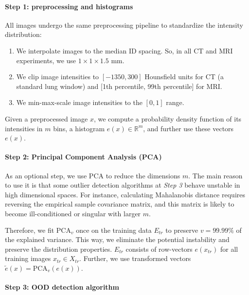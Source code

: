 \paragraph{Step 1: preprocessing and histograms} All images undergo the same preprocessing pipeline to standardize the intensity distribution:

\begin{enumerate}	
	\item We interpolate images to the median ID spacing. So, in all CT and MRI experiments, we use $1 \times 1 \times 1.5$ mm.
	\item We clip image intensities to $[-1350, 300]$ Hounsfield units for CT (a standard lung window) and [1{th} percentile, 99{th} percentile] for MRI.
	\item We min-max-scale image intensities to the $[0, 1]$ range.
\end{enumerate}

Given a preprocessed image $x$, we compute a probability density function of its intensities in $m$ bins, a histogram $e(x) \in \mathbb{R}^m$, and further use these vectors $e(x)$.

\paragraph{Step 2: Principal Component Analysis (PCA)} As an optional step, we use PCA to reduce the dimensions $m$. The main reason to use it is that some outlier detection algorithms at \textit{Step 3} behave unstable in high dimensional spaces. For instance, calculating Mahalanobis distance requires reversing the empirical sample covariance matrix, and this matrix is likely to become ill-conditioned or singular with larger $m$.

Therefore, we fit PCA$_v$ once on the training data $E_{tr}$ to preserve $v = 99.99\%$ of the explained variance. This way, we eliminate the potential instability and preserve the distribution properties. $E_{tr}$ consists of row-vectors $e(x_{tr})$ for all training images $x_{tr} \in X_{tr}$. Further, we use transformed vectors $\tilde{e}(x) = \text{PCA}_v (e(x))$. %

\paragraph{Step 3: OOD detection algorithm}

